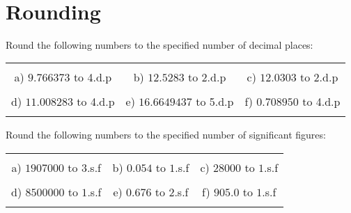 \documentclass[12pt]{article}
\begin{document}
\pagestyle{fancy}
\\
\fancyfoot{} 
\section{Rounding}
Round the following numbers to the specified number of decimal places:
\begin{table}[h!]
\centering
\begin{tabular}{c c c}
\hspace{4cm} & \hspace{4cm} & \hspace{4cm} \\
a) ${9}.{7}{6}{6}{3}{7}{3}$ to 4.d.p & b) ${12}.{5}{2}{8}{3}$ to 2.d.p & c) ${12}.{0}{3}{0}{3}$ to 2.d.p\\ \\
d) ${11}.{0}{0}{8}{2}{8}{3}$ to 4.d.p & e) ${16}.{6}{6}{4}{9}{4}{3}{7}$ to 5.d.p & f) ${0}.{7}{0}{8}{9}{5}{0}$ to 4.d.p\\ \\
\end{tabular}
\end{table}
\newline
Round the following numbers to the specified number of significant figures:
\begin{table}[h!]
\centering
\begin{tabular}{c c c}
\hspace{4cm} & \hspace{4cm} & \hspace{4cm} \\
a) $1907000$ to $3$.s.f & b) $0.054$ to $1$.s.f & c) $28000$ to $1$.s.f\\ \\
d) $8500000$ to $1$.s.f & e) $0.676$ to $2$.s.f & f) $905.0$ to $1$.s.f\\ \\
\end{tabular}
\end{table}
\newline
\end{document}

